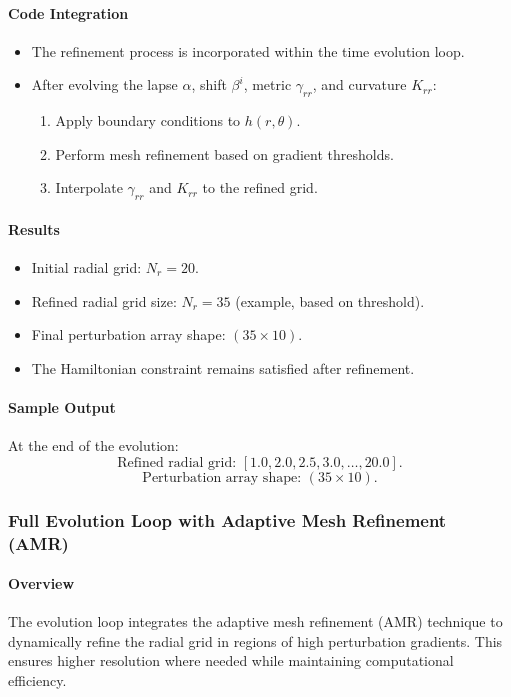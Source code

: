 \documentclass[12pt]{article}
\begin{document}
\paragraph{Code Integration}
\begin{itemize}
    \item The refinement process is incorporated within the time evolution loop.
    \item After evolving the lapse $\alpha$, shift $\beta^i$, metric $\gamma_{rr}$, and curvature $K_{rr}$:
    \begin{enumerate}
        \item Apply boundary conditions to $h(r, \theta)$.
        \item Perform mesh refinement based on gradient thresholds.
        \item Interpolate $\gamma_{rr}$ and $K_{rr}$ to the refined grid.
    \end{enumerate}
\end{itemize}

\paragraph{Results}
\begin{itemize}
    \item Initial radial grid: $N_r = 20$.
    \item Refined radial grid size: $N_r = 35$ (example, based on threshold).
    \item Final perturbation array shape: $(35 \times 10)$.
    \item The Hamiltonian constraint remains satisfied after refinement.
\end{itemize}

\paragraph{Sample Output}
At the end of the evolution:
\[
\text{Refined radial grid: } [1.0, 2.0, 2.5, 3.0, \dots, 20.0].
\]
\[
\text{Perturbation array shape: } (35 \times 10).
\]

\subsubsection{Full Evolution Loop with Adaptive Mesh Refinement (AMR)}

\paragraph{Overview}
The evolution loop integrates the adaptive mesh refinement (AMR) technique to dynamically refine the radial grid in regions of high perturbation gradients. This ensures higher resolution where needed while maintaining computational efficiency.
\end{document}
